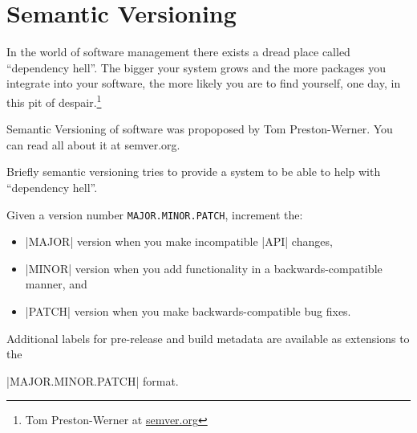 \chapter{Semantic Versioning}

In the world of software management there exists a dread place called \enquote{dependency hell}. The bigger your system grows and the more packages you integrate into your software, the more likely you are to find yourself, one day, in this pit of despair.\footnote{Tom Preston-Werner at \protect\url{semver.org}}

Semantic Versioning of software was propoposed by Tom Preston-Werner. You can read all about it
at semver.org.

Briefly semantic versioning tries to provide a system to be able to help with \enquote{dependency hell}.

Given a version number \texttt{MAJOR.MINOR.PATCH}, increment the:

\begin{itemize}
  \item |MAJOR| version when you make incompatible |API| changes,
  \item |MINOR| version when you add functionality in a backwards-compatible manner, and
  \item |PATCH| version when you make backwards-compatible bug fixes.
\end{itemize}

Additional labels for pre-release and build metadata are available as extensions to the 

|MAJOR.MINOR.PATCH| format.
